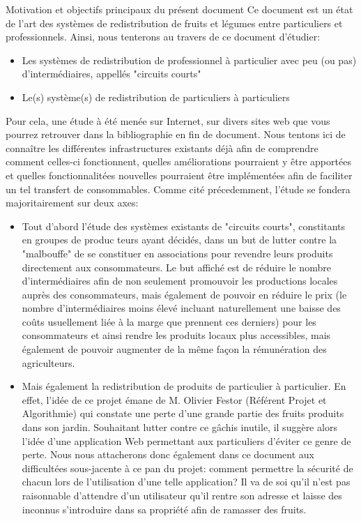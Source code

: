 Motivation et objectifs principaux du présent document
Ce document est un état de l'art des systèmes de redistribution de fruits et légumes entre particuliers et professionnels. Ainsi, nous tenterons au travers de ce document d'étudier:
\begin{itemize}
\item{Les systèmes de redistribution de professionnel à particulier avec peu (ou pas) d'intermédiaires, appellés "circuits courts"} 
\item{Le(s) système(s) de redistribution de particuliers à particuliers}
\end{itemize}
Pour cela, une étude à été menée sur Internet, sur divers sites web que vous pourrez retrouver dans la bibliographie en fin de document. Nous tentons ici de connaître les différentes infrastructures existants déjà afin de comprendre comment celles-ci fonctionnent, quelles améliorations pourraient y être apportées et quelles fonctionnalitées nouvelles pourraient être implémentées afin de faciliter un tel transfert de consommables. Comme cité précedemment, l'étude se fondera majoritairement sur deux axes:

\begin{itemize}
	\item Tout d'abord l'étude des systèmes existants de "circuits courts", constitants en groupes de produc
teurs ayant décidés, dans un but de lutter contre la "malbouffe" de se constituer en associations pour revendre leurs produits directement aux consommateurs. Le but affiché est de réduire le nombre d'intermédiaires afin de non seulement promouvoir les productions locales auprès des consommateurs, mais également de pouvoir en réduire le prix (le nombre d'intermédiaires moins élevé incluant naturellement une baisse des coûts usuellement liée à la marge que prennent ces derniers) pour les consommateurs et ainsi rendre les produits locaux plus accessibles, mais également de pouvoir augmenter de la même façon la rémunération des agriculteurs. 
	\item Mais également la redistribution de produits de particulier à particulier. En effet, l'idée de ce projet émane de M. Olivier Festor (Référent Projet et Algorithmie) qui constate une perte d'une grande partie des fruits produits dans son jardin. Souhaitant lutter contre ce gâchis inutile, il suggère alors l'idée d'une application Web permettant aux particuliers d'éviter ce genre de perte. Nous nous attacherons donc également dans ce document aux difficultées sous-jacente à ce pan du projet: comment permettre la sécurité de chacun lors de l'utilisation d'une telle application? Il va de soi qu'il n'est pas raisonnable d'attendre d'un utilisateur qu'il rentre son adresse et laisse des inconnus s'introduire dans sa propriété afin de ramasser des fruits.
\end{itemize}
